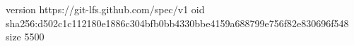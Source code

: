 version https://git-lfs.github.com/spec/v1
oid sha256:d502c1c112180e1886c304bfb0bb4330bbe4159a688799e756f82e830696f548
size 5500
